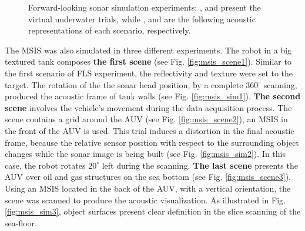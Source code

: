 \documentclass[final,5p,times]{elsarticle}
\begin{document}
\begin{figure}[!ht]
{        \label{fig:fls_sim2}
    }
    \captionsetup{justification=centering}
    \caption{Forward-looking sonar simulation experiments: ,  and  present the virtual underwater trials, while ,  and  are the following acoustic representations of each scenario, respectively.}
    \label{fig:fls}
\end{figure}

The MSIS was also simulated in three different experiments. The robot in a big textured tank composes \textbf{the first scene} (see Fig. \ref{fig:msis_scene1}). Similar to the first scenario of FLS experiment, the reflectivity and texture were set to the target. The rotation of the the sonar head position, by a complete $360^{\circ}$ scanning, produced the acoustic frame of tank walls (see Fig. \ref{fig:msis_sim1}). \textbf{The second scene} involves the vehicle's movement during the data acquisition process. The scene contains a grid around the AUV (see Fig. \ref{fig:msis_scene2}), an MSIS in the front of the AUV is used. This trial induces a distortion in the final acoustic frame, because the relative sensor position with respect to the surrounding object changes while the sonar image is being built (see Fig. \ref{fig:msis_sim2}). In this case, the robot rotates $20^{\circ}$ left during the scanning. \textbf{The last scene} presents the AUV over oil and gas structures on the sea bottom (see Fig. \ref{fig:msis_scene3}). Using an MSIS located in the back of the AUV, with a vertical orientation, the scene was scanned to produce the acoustic visualization. As illustrated in Fig. \ref{fig:msis_sim3}, object surfaces present clear definition in the slice scanning of the sea-floor.
\end{document}
